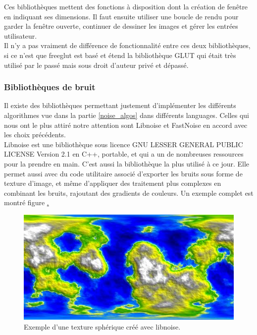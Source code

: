 \documentclass[a4paper]{article}
\begin{document}
    Ces bibliothèques mettent des fonctions à disposition dont la création de fenêtre en indiquant ses dimensions. Il faut ensuite utiliser une boucle de rendu pour garder la fenêtre ouverte, continuer de dessiner les images et gérer les entrées utilisateur.\\
    
    Il n'y a pas vraiment de différence de fonctionnalité entre ces deux bibliothèques, si ce n'est que freeglut est basé et étend la bibliothèque GLUT qui était très utilisé par le passé mais sous droit d'auteur privé et dépassé.

      
 \subsubsection{Bibliothèques de bruit}
    
    Il existe des bibliothèques permettant justement d'implémenter les différents algorithmes vue dans la partie \ref{noise_algos} dans différents languages.
    Celles qui nous ont le plus attiré notre attention sont Libnoise \cite{LibNoise} et FastNoise \cite{FastNoise} en accord avec les choix précédents.\\

    Libnoise est une bibliothèque sous licence GNU LESSER GENERAL PUBLIC LICENSE Version 2.1 en C++, portable, et qui a un de nombreuses ressources pour la prendre en main. C'est aussi la bibliothèque la plus utilisé à ce jour. Elle permet aussi avec du code utilitaire associé d'exporter les bruits sous forme de texture d'image, et même d'appliquer des traitement plus complexes en combinant les bruits, rajoutant des gradients de couleurs. Un exemple complet est montré figure \href{libnoiseExample}.\\
    
    \begin{figure}[!ht]
        \begin{center} \includegraphics[width=0.8\linewidth]{img/noise/libnoise_sphericalheightmap.jpg} \end{center}
        \caption{\label{libnoiseExample}Exemple d'une texture sphérique créé avec libnoise\protect\footnotemark .}
        \end{figure}
    
\end{document}
